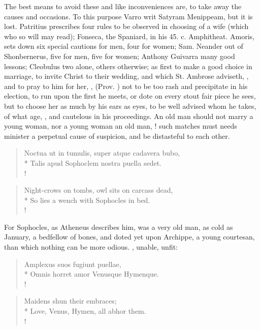 The best means to avoid these and like inconveniences are, to take away
the causes and occasions. To this purpose Varro writ Satyram
Menippeam, but it is lost. Patritius prescribes four rules to be
observed in choosing of a wife (which who so will may read); Fonseca,
the Spaniard, in his 45. c. Amphitheat. Amoris, sets down six special
cautions for men, four for women; Sam. Neander out of Shonbernerus,
five for men, five for women; Anthony Guivarra many good lessons;
Cleobulus two alone, others otherwise; as first to make a good
choice in marriage, to invite Christ to their wedding, and which
St. Ambrose adviseth, , and to pray
to him for her, , (Prov. ) not to
be too rash and precipitate in his election, to run upon the first he
meets, or dote on every stout fair piece he sees, but to choose her as
much by his ears as eyes, to be well advised whom he takes, of what
age, \etc{}, and cautelous in his proceedings. An old man should not marry a
young woman, nor a young woman an old man, ! such matches
must needs minister a perpetual cause of suspicion, and be distasteful to each
other.
%
\begin{latin}
\begin{verse}%
Noctua ut in tumulis, super atque cadavera bubo,\\*
Talis apud Sophoclem nostra puella sedet.\\!
\end{verse}%
\end{latin}
\translationrule%
\begin{verse}%
Night-crows on tombs, owl sits on carcass dead,\\*
So lies a wench with Sophocles in bed.\\!
\end{verse}%
%

For Sophocles, as Atheneus describes him, was a very old man, as
cold as January, a bedfellow of bones, and doted yet upon Archippe, a
young courtesan, than which nothing can be more odious. , unable, unfit:
%
\begin{latin}
\begin{verse}%
Amplexus suos fugiunt puellae,\\*
Omnis horret amor Venusque Hymenque.\\!
\end{verse}%
\end{latin}
\translationrule%
\begin{verse}%
Maidens shun their embraces;\\*
Love, Venus, Hymen, all abhor them.\\!
\end{verse}%
%

